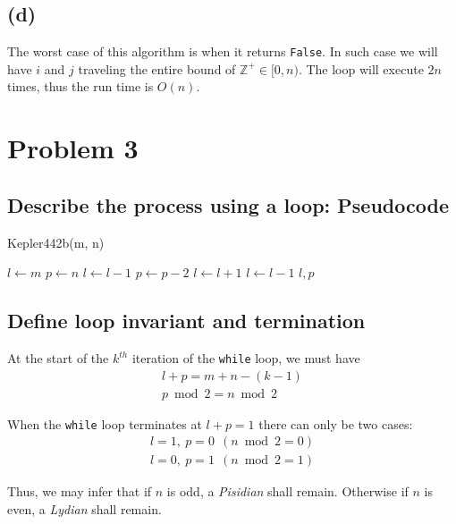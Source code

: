 \documentclass[12pt]{article}
\newcommand{\inlinecode}{\texttt}
\begin{document}
\subsection{(d)}
The worst case of this algorithm is when it returns \inlinecode{False}. In such case we will have $i$ and $j$ traveling the entire bound of $\mathbb{Z^+} \in [0, n)$. The loop will execute $2n$ times, thus the run time is $O(n)$.

\section{Problem 3}
\subsection{Describe the process using a loop: Pseudocode}

\begin{algorithm}
\caption{Kepler442b(m, n)}\label{Kepler442b}
\begin{algorithmic}[1]
\Procedure{}{}
\State $l \gets m$
\State $p \gets n$
    \State {}
        \State $l \gets l - 1$
        \State $p \gets p - 2$
        \State $l \gets l + 1$
    \Else
        \State $l \gets l - 1$
    \EndIf
\EndWhile
\State \Return $l, p$
\EndProcedure
\end{algorithmic}
\end{algorithm}

\subsection{Define loop invariant and termination}
At the start of the $k^{th}$ iteration of the \inlinecode{while} loop, we must have
\begin{gather}
    l + p = m + n - (k - 1) \\
    p\bmod 2 = n \bmod 2
\end{gather}

When the \inlinecode{while} loop terminates at $l + p = 1$ there can only be two cases:
\begin{gather}
    l = 1, \ p = 0 \ \ (n \bmod 2 = 0) \\
    l = 0, \ p = 1 \ \ (n \bmod 2 = 1)
\end{gather}

Thus, we may infer that if $n$ is odd, a \textit{Pisidian} shall remain. Otherwise if $n$ is even, a \textit{Lydian} shall remain.
\end{document}
